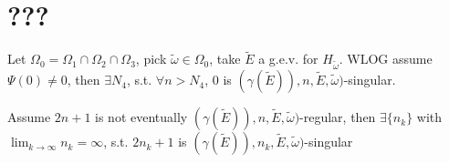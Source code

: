\section{???}
Let $\Omega_0=\Omega_1\cap\Omega_2\cap\Omega_3$, pick $\tilde{\omega}\in\Omega_0$, take $\tilde{E}$ a g.e.v. for $H_{\tilde{\omega}}$.
WLOG assume $\Psi(0)\neq 0$, then $\exists N_4$, s.t. $\forall n>N_4$, 0 is $(\gamma(\tilde{E})),n,\tilde{E},\tilde{\omega})$-singular.

Assume $2n+1$ is not eventually $(\gamma(\tilde{E})),n,\tilde{E},\tilde{\omega})$-regular, then $\exists \{n_k\}$ with $\lim_{k\to\infty} n_k=\infty$, s.t. $2n_k+1$ is  $(\gamma(\tilde{E})),n_k,\tilde{E},\tilde{\omega})$-singular
